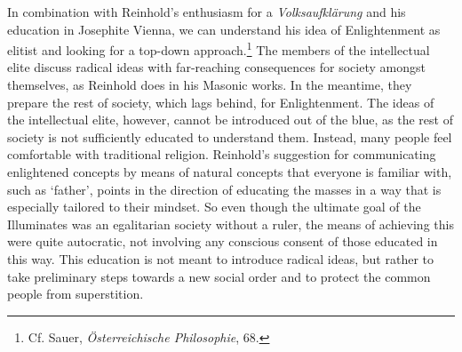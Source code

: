 In combination with Reinhold's enthusiasm for a \textit{Volksaufkl\"{a}rung} and his education in Josephite Vienna, we can understand his idea of Enlightenment as elitist and looking for a top{-}down approach.\footnote{ Cf. Sauer, \textit{\"{O}sterreichische Philosophie}, 68.} The members of the intellectual elite discuss radical ideas with far{-}reaching consequences for society amongst themselves, as Reinhold does in his Masonic works. In the meantime, they prepare the rest of society, which lags behind, for Enlightenment. The ideas of the intellectual elite, however, cannot be introduced out of the blue, as the rest of society is not sufficiently educated to understand them. Instead, many people feel comfortable with traditional religion. Reinhold's suggestion for communicating enlightened concepts by means of natural concepts that everyone is familiar with, such as `father', points in the direction of educating the masses in a way that is especially tailored to their mindset. So even though the ultimate goal of the Illuminates was an egalitarian society without a ruler, the means of achieving this were quite autocratic, not involving any conscious consent of those educated in this way. This education is not meant to introduce radical ideas, but rather to take preliminary steps towards a new social order and to protect the common people from superstition. 

